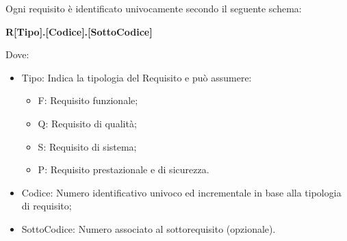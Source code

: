 
    Ogni requisito è identificato univocamente secondo il seguente schema:
        \begin{center}
            \large{\textbf{R[Tipo].[Codice].[SottoCodice]}}
        \end{center}
    Dove:
    \begin{itemize}
        \item Tipo: Indica la tipologia del Requisito e può assumere:
          \begin{itemize}
            \item F: Requisito funzionale;
            \item Q: Requisito di qualità;
            \item S: Requisito di sistema;
            \item P: Requisito prestazionale e di sicurezza.
          \end{itemize}
        \item Codice: Numero identificativo univoco ed incrementale in base alla tipologia di requisito;
        \item SottoCodice: Numero associato al sottorequisito (opzionale).
    \end{itemize}

